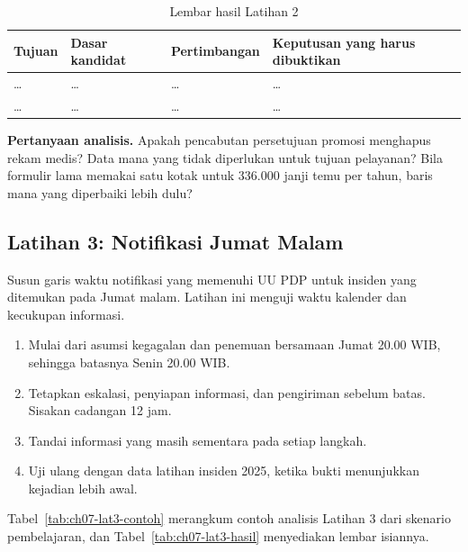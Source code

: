 \begin{table}[!htb]
  \centering\small
  \caption{Lembar hasil Latihan 2}\label{tab:ch07-lat2-hasil}
  \begin{tabularx}{\textwidth}{|>{\raggedright\arraybackslash}p{}|>{\raggedright\arraybackslash}X|>{\raggedright\arraybackslash}X|>{\raggedright\arraybackslash}X|}
    \hline
    \textbf{Tujuan} & \textbf{Dasar kandidat} & \textbf{Pertimbangan} & \textbf{Keputusan yang harus
    dibuktikan} \\ \hline
    \dots & \dots & \dots & \dots \\ \hline
    \dots & \dots & \dots & \dots \\ \hline
  \end{tabularx}
\end{table}

\textbf{Pertanyaan analisis.} Apakah pencabutan persetujuan promosi menghapus rekam medis? Data mana
yang tidak diperlukan untuk tujuan pelayanan? Bila formulir lama memakai satu kotak untuk 336.000
janji temu per tahun, baris mana yang diperbaiki lebih dulu?

\subsection*{Latihan 3: Notifikasi Jumat Malam}

Susun garis waktu notifikasi yang memenuhi UU PDP untuk insiden yang ditemukan pada Jumat malam.
Latihan ini menguji waktu kalender dan kecukupan informasi.

\begin{enumerate}
  \item Mulai dari asumsi kegagalan dan penemuan bersamaan Jumat 20.00 WIB, sehingga batasnya Senin
  20.00 WIB.
  \item Tetapkan eskalasi, penyiapan informasi, dan pengiriman sebelum batas. Sisakan cadangan 12
  jam.
  \item Tandai informasi yang masih sementara pada setiap langkah.
  \item Uji ulang dengan data latihan insiden 2025, ketika bukti menunjukkan kejadian lebih awal.
\end{enumerate}

Tabel~\ref{tab:ch07-lat3-contoh} merangkum contoh analisis Latihan 3 dari skenario pembelajaran, dan
Tabel~\ref{tab:ch07-lat3-hasil} menyediakan lembar isiannya.


